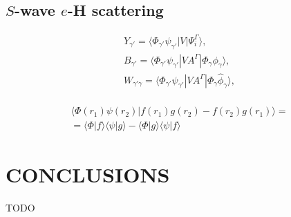 \documentclass[aip
, pra
, showpacs
, aps
, twocolumn
, groupedaddress
, floatfix
]{revtex4}
\newcommand{\beq}{\begin{equation}}
\newcommand{\eeq}{\end{equation}}
\newcommand{\barr}{\begin{array}}
\newcommand{\earr}{\end{array}}
\begin{document}
\subsection{$S$-wave $e$-H scattering}



\beq \barr{l}
Y_{\gamma'} = \langle \Phi_{\gamma'}  \psi_{\gamma'} |V|\Psi_i^{\Gamma} \rangle,\\
B_{\gamma'} = \langle  \Phi_{\gamma'}  \psi_{\gamma'} |VA^{\Gamma} |\Phi_{\gamma} \phi_{\gamma} \rangle,\\
W_{\gamma' \gamma} = \langle \Phi_{\gamma'}  \psi_{\gamma'} |V A^{\Gamma} |\Phi_{\gamma} \widehat{\phi}_{\gamma} \rangle,\\
\earr \label{Psi_} \eeq

\beq \barr{l}
\langle  \Phi(r_1) \psi(r_2) |f(r_1) g(r_2) - f(r_2) g(r_1) \rangle = \\
=\langle  \Phi |f \rangle  \langle  \psi |g \rangle -
\langle  \Phi |g \rangle  \langle  \psi |f \rangle
\earr \eeq


\section{CONCLUSIONS}
TODO


\begin{acknowledgments}
\end{acknowledgments}





%
\end{document}
